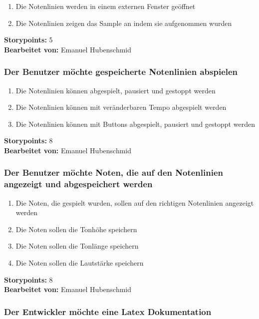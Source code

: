 \begin{enumerate}
 \item Die Notenlinien  werden in einem externen Fenster geöffnet
 \item Die Notenlinien zeigen das Sample an indem sie aufgenommen wurden
\end{enumerate}

\textbf{Storypoints:} 5 \\
\textbf{Bearbeitet von: } Emanuel Hubenschmid \\


\subsubsection{Der Benutzer möchte gespeicherte Notenlinien abspielen}

\begin{enumerate}
 \item Die Notenlinien  können abgespielt, pausiert und gestoppt werden
 \item Die Notenlinien  können mit veränderbaren Tempo abgespielt werden
 \item Die Notenlinien  können mit Buttons abgespielt, pausiert und gestoppt werden
\end{enumerate}

\textbf{Storypoints:} 8 \\
\textbf{Bearbeitet von: } Emanuel Hubenschmid \\


\subsubsection{Der Benutzer möchte Noten, die auf den Notenlinien angezeigt und abgespeichert 
werden}

\begin{enumerate}
 \item Die Noten, die gespielt wurden, sollen auf den richtigen Notenlinien angezeigt werden
 \item Die Noten sollen die Tonhöhe speichern
 \item Die Noten sollen die Tonlänge speichern
 \item Die Noten sollen die Lautstärke speichern
\end{enumerate}

\textbf{Storypoints:} 8 \\
\textbf{Bearbeitet von: } Emanuel Hubenschmid \\


\subsubsection{Der Entwickler möchte eine Latex Dokumentation}

